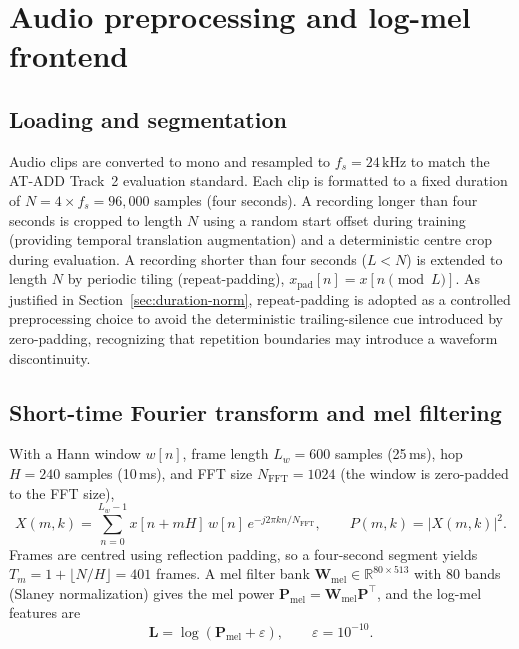 \section{Audio preprocessing and log-mel frontend}
\label{sec:frontend}

\subsection{Loading and segmentation}

Audio clips are converted to mono and resampled to $f_s = 24\,\text{kHz}$ to match the AT-ADD Track~2 evaluation standard. Each clip is formatted to a fixed duration of $N = 4 \times f_s = 96{,}000$ samples (four seconds). A recording longer than four seconds is cropped to length $N$ using a random start offset during training (providing temporal translation augmentation) and a deterministic centre crop during evaluation. A recording shorter than four seconds ($L < N$) is extended to length $N$ by periodic tiling (repeat-padding), $x_{\mathrm{pad}}[n] = x[n \pmod L]$. As justified in Section~\ref{sec:duration-norm}, repeat-padding is adopted as a controlled preprocessing choice to avoid the deterministic trailing-silence cue introduced by zero-padding, recognizing that repetition boundaries may introduce a waveform discontinuity.

\subsection{Short-time Fourier transform and mel filtering}

With a Hann window $w[n]$, frame length $L_w = 600$ samples (25\,ms), hop $H = 240$ samples (10\,ms), and FFT size $N_{\mathrm{FFT}} = 1024$ (the window is zero-padded to the FFT size),
\begin{equation}
X(m,k) = \sum_{n=0}^{L_w-1} x[n + mH]\, w[n]\, e^{-j2\pi kn / N_{\mathrm{FFT}}}, \qquad P(m,k) = |X(m,k)|^2 .
\label{eq:stft}
\end{equation}
Frames are centred using reflection padding, so a four-second segment yields $T_m = 1 + \lfloor N/H \rfloor = 401$ frames. A mel filter bank $\mathbf{W}_{\mathrm{mel}} \in \mathbb{R}^{80 \times 513}$ with 80 bands (Slaney normalization) gives the mel power $\mathbf{P}_{\mathrm{mel}} = \mathbf{W}_{\mathrm{mel}} \mathbf{P}^{\top}$, and the log-mel features are
\begin{equation}
\mathbf{L} = \log(\mathbf{P}_{\mathrm{mel}} + \varepsilon), \qquad \varepsilon = 10^{-10}.
\label{eq:logmel}
\end{equation}

